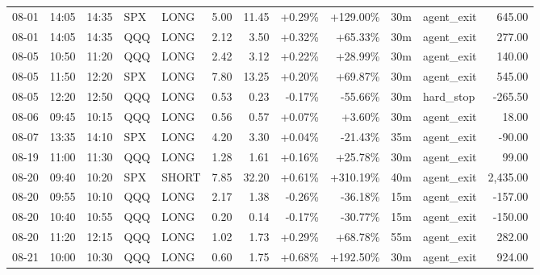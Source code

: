 \documentclass[11pt,a4paper,twoside]{article}
\begin{document}
\begin{center}
\begin{longtable}{>{\color{txtmain}}l l l l l r r r r r >{\color{txtmain}}l r}
08-01 & 14:05 & 14:35 & SPX & LONG & 5.00 & 11.45 & \textcolor{wingreen}{+0.29\%} & \textcolor{wingreen}{+129.00\%} & 30m & agent\_exit & \textcolor{wingreen}{645.00} \\
08-01 & 14:05 & 14:35 & QQQ & LONG & 2.12 & 3.50 & \textcolor{wingreen}{+0.32\%} & \textcolor{wingreen}{+65.33\%} & 30m & agent\_exit & \textcolor{wingreen}{277.00} \\
08-05 & 10:50 & 11:20 & QQQ & LONG & 2.42 & 3.12 & \textcolor{wingreen}{+0.22\%} & \textcolor{wingreen}{+28.99\%} & 30m & agent\_exit & \textcolor{wingreen}{140.00} \\
08-05 & 11:50 & 12:20 & SPX & LONG & 7.80 & 13.25 & \textcolor{wingreen}{+0.20\%} & \textcolor{wingreen}{+69.87\%} & 30m & agent\_exit & \textcolor{wingreen}{545.00} \\
08-05 & 12:20 & 12:50 & QQQ & LONG & 0.53 & 0.23 & \textcolor{lossred}{-0.17\%} & \textcolor{lossred}{-55.66\%} & 30m & hard\_stop & \textcolor{lossred}{-265.50} \\
08-06 & 09:45 & 10:15 & QQQ & LONG & 0.56 & 0.57 & \textcolor{wingreen}{+0.07\%} & \textcolor{wingreen}{+3.60\%} & 30m & agent\_exit & \textcolor{wingreen}{18.00} \\
08-07 & 13:35 & 14:10 & SPX & LONG & 4.20 & 3.30 & \textcolor{wingreen}{+0.04\%} & \textcolor{lossred}{-21.43\%} & 35m & agent\_exit & \textcolor{lossred}{-90.00} \\
08-19 & 11:00 & 11:30 & QQQ & LONG & 1.28 & 1.61 & \textcolor{wingreen}{+0.16\%} & \textcolor{wingreen}{+25.78\%} & 30m & agent\_exit & \textcolor{wingreen}{99.00} \\
08-20 & 09:40 & 10:20 & SPX & SHORT & 7.85 & 32.20 & \textcolor{wingreen}{+0.61\%} & \textcolor{wingreen}{+310.19\%} & 40m & agent\_exit & \textcolor{wingreen}{2,435.00} \\
08-20 & 09:55 & 10:10 & QQQ & LONG & 2.17 & 1.38 & \textcolor{lossred}{-0.26\%} & \textcolor{lossred}{-36.18\%} & 15m & agent\_exit & \textcolor{lossred}{-157.00} \\
08-20 & 10:40 & 10:55 & QQQ & LONG & 0.20 & 0.14 & \textcolor{lossred}{-0.17\%} & \textcolor{lossred}{-30.77\%} & 15m & agent\_exit & \textcolor{lossred}{-150.00} \\
08-20 & 11:20 & 12:15 & QQQ & LONG & 1.02 & 1.73 & \textcolor{wingreen}{+0.29\%} & \textcolor{wingreen}{+68.78\%} & 55m & agent\_exit & \textcolor{wingreen}{282.00} \\
08-21 & 10:00 & 10:30 & QQQ & LONG & 0.60 & 1.75 & \textcolor{wingreen}{+0.68\%} & \textcolor{wingreen}{+192.50\%} & 30m & agent\_exit & \textcolor{wingreen}{924.00} \\

\end{longtable}
\end{center}
\end{document}
